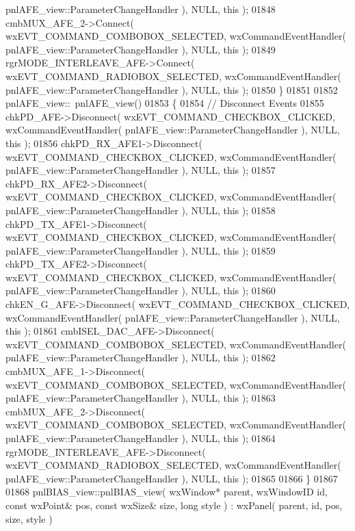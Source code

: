 \begin{DoxyCode}
      pnlAFE_view::ParameterChangeHandler ), NULL, \textcolor{keyword}{this} );
01848     cmbMUX_AFE_2->Connect( wxEVT\_COMMAND\_COMBOBOX\_SELECTED, wxCommandEventHandler( 
      pnlAFE_view::ParameterChangeHandler ), NULL, \textcolor{keyword}{this} );
01849     rgrMODE_INTERLEAVE_AFE->Connect( wxEVT\_COMMAND\_RADIOBOX\_SELECTED, wxCommandEventHandler( 
      pnlAFE_view::ParameterChangeHandler ), NULL, \textcolor{keyword}{this} );
01850 \}
01851 
01852 pnlAFE_view::~pnlAFE_view()
01853 \{
01854     \textcolor{comment}{// Disconnect Events}
01855     chkPD_AFE->Disconnect( wxEVT\_COMMAND\_CHECKBOX\_CLICKED, wxCommandEventHandler( 
      pnlAFE_view::ParameterChangeHandler ), NULL, \textcolor{keyword}{this} );
01856     chkPD_RX_AFE1->Disconnect( wxEVT\_COMMAND\_CHECKBOX\_CLICKED, wxCommandEventHandler( 
      pnlAFE_view::ParameterChangeHandler ), NULL, \textcolor{keyword}{this} );
01857     chkPD_RX_AFE2->Disconnect( wxEVT\_COMMAND\_CHECKBOX\_CLICKED, wxCommandEventHandler( 
      pnlAFE_view::ParameterChangeHandler ), NULL, \textcolor{keyword}{this} );
01858     chkPD_TX_AFE1->Disconnect( wxEVT\_COMMAND\_CHECKBOX\_CLICKED, wxCommandEventHandler( 
      pnlAFE_view::ParameterChangeHandler ), NULL, \textcolor{keyword}{this} );
01859     chkPD_TX_AFE2->Disconnect( wxEVT\_COMMAND\_CHECKBOX\_CLICKED, wxCommandEventHandler( 
      pnlAFE_view::ParameterChangeHandler ), NULL, \textcolor{keyword}{this} );
01860     chkEN_G_AFE->Disconnect( wxEVT\_COMMAND\_CHECKBOX\_CLICKED, wxCommandEventHandler( 
      pnlAFE_view::ParameterChangeHandler ), NULL, \textcolor{keyword}{this} );
01861     cmbISEL_DAC_AFE->Disconnect( wxEVT\_COMMAND\_COMBOBOX\_SELECTED, wxCommandEventHandler( 
      pnlAFE_view::ParameterChangeHandler ), NULL, \textcolor{keyword}{this} );
01862     cmbMUX_AFE_1->Disconnect( wxEVT\_COMMAND\_COMBOBOX\_SELECTED, wxCommandEventHandler( 
      pnlAFE_view::ParameterChangeHandler ), NULL, \textcolor{keyword}{this} );
01863     cmbMUX_AFE_2->Disconnect( wxEVT\_COMMAND\_COMBOBOX\_SELECTED, wxCommandEventHandler( 
      pnlAFE_view::ParameterChangeHandler ), NULL, \textcolor{keyword}{this} );
01864     rgrMODE_INTERLEAVE_AFE->Disconnect( wxEVT\_COMMAND\_RADIOBOX\_SELECTED, wxCommandEventHandler( 
      pnlAFE_view::ParameterChangeHandler ), NULL, \textcolor{keyword}{this} );
01865     
01866 \}
01867 
01868 pnlBIAS_view::pnlBIAS_view( wxWindow* parent, wxWindowID \textcolor{keywordtype}{id}, \textcolor{keyword}{const} wxPoint& pos, \textcolor{keyword}{const} wxSize& 
      size, \textcolor{keywordtype}{long} style ) : wxPanel( parent, id, pos, size, style )

\end{DoxyCode}

